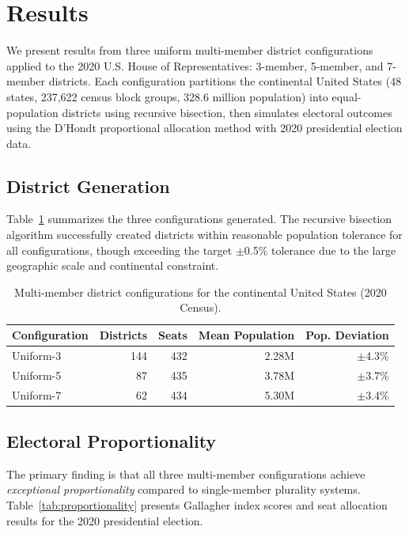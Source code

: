 \section{Results}

We present results from three uniform multi-member district configurations applied to the 2020 U.S. House of Representatives: 3-member, 5-member, and 7-member districts. Each configuration partitions the continental United States (48 states, 237,622 census block groups, 328.6 million population) into equal-population districts using recursive bisection, then simulates electoral outcomes using the D'Hondt proportional allocation method with 2020 presidential election data.

\subsection{District Generation}

Table~\ref{tab:district-configs} summarizes the three configurations generated. The recursive bisection algorithm successfully created districts within reasonable population tolerance for all configurations, though exceeding the target $\pm$0.5\% tolerance due to the large geographic scale and continental constraint.

\begin{table}[h]
\centering
\caption{Multi-member district configurations for the continental United States (2020 Census).}
\label{tab:district-configs}
\begin{tabular}{lrrrr}
\toprule
Configuration & Districts & Seats & Mean Population & Pop. Deviation \\
\midrule
Uniform-3 & 144 & 432 & 2.28M & $\pm$4.3\% \\
Uniform-5 & 87 & 435 & 3.78M & $\pm$3.7\% \\
Uniform-7 & 62 & 434 & 5.30M & $\pm$3.4\% \\
\bottomrule
\end{tabular}
\end{table}

\subsection{Electoral Proportionality}

The primary finding is that all three multi-member configurations achieve \emph{exceptional proportionality} compared to single-member plurality systems. Table~\ref{tab:proportionality} presents Gallagher index scores and seat allocation results for the 2020 presidential election.

